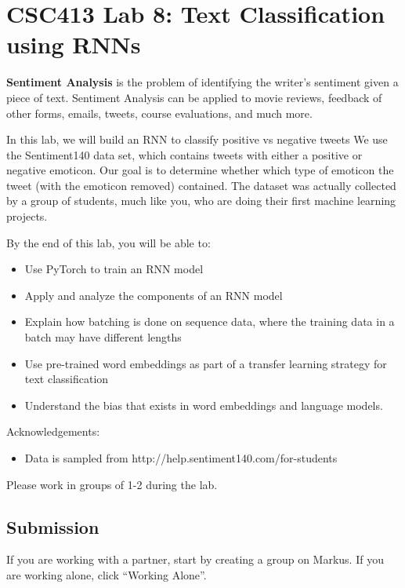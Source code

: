 \documentclass[
  letterpaper,
  DIV=11,
  numbers=noendperiod]{scrartcl}
\author{}
\date{}
\providecommand{\tightlist}{%
  \setlength{\itemsep}{0pt}\setlength{\parskip}{0pt}}
\begin{document}
\section{CSC413 Lab 8: Text Classification using
RNNs}\label{csc413-lab-8-text-classification-using-rnns}

\textbf{Sentiment Analysis} is the problem of identifying the writer's
sentiment given a piece of text. Sentiment Analysis can be applied to
movie reviews, feedback of other forms, emails, tweets, course
evaluations, and much more.

In this lab, we will build an RNN to classify positive vs negative
tweets We use the Sentiment140 data set, which contains tweets with
either a positive or negative emoticon. Our goal is to determine whether
which type of emoticon the tweet (with the emoticon removed) contained.
The dataset was actually collected by a group of students, much like
you, who are doing their first machine learning projects.

By the end of this lab, you will be able to:

\begin{itemize}
\tightlist
\item
  Use PyTorch to train an RNN model
\item
  Apply and analyze the components of an RNN model
\item
  Explain how batching is done on sequence data, where the training data
  in a batch may have different lengths
\item
  Use pre-trained word embeddings as part of a transfer learning
  strategy for text classification
\item
  Understand the bias that exists in word embeddings and language
  models.
\end{itemize}

Acknowledgements:

\begin{itemize}
\tightlist
\item
  Data is sampled from http://help.sentiment140.com/for-students
\end{itemize}

Please work in groups of 1-2 during the lab.

\subsection{Submission}\label{submission}

If you are working with a partner, start by creating a group on Markus.
If you are working alone, click ``Working Alone''.
\end{document}
